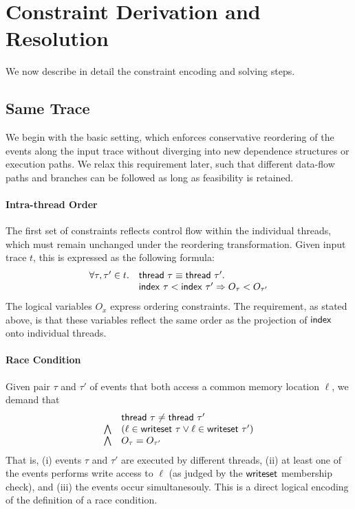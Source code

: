 \section{Constraint Derivation and Resolution}

We now describe in detail the constraint encoding and solving steps.

\subsection{Same Trace}

We begin with the basic setting, which enforces conservative reordering of the events along the input trace without diverging into new dependence structures or execution paths. We relax this requirement later, such that different data-flow paths and branches can be followed as long as feasibility is retained.

\paragraph{Intra-thread Order}

The first set of constraints reflects control flow within the individual threads, which must remain unchanged under the reordering transformation. Given input trace $t$, this is expressed as the following formula:
$$
\begin{array}{rl}
	\forall \tau,\tau' \in t. & {\sf thread}\ \tau \equiv {\sf thread}\ \tau'. \\
										& {\sf index}\ \tau < {\sf index}\ \tau' \Rightarrow O_{\tau} < O_{\tau'}
\end{array}
$$ 
The logical variables $O_x$ express ordering constraints. The requirement, as stated above, is that these variables
reflect the same order as the projection of ${\sf index}$ onto individual threads.

\paragraph{Race Condition}

Given pair $\tau$ and $\tau'$ of events that both access a common memory location $\ell$, we demand that
$$
\begin{array}{rl}
					& {\sf thread}\ \tau \neq {\sf thread}\ \tau' \\
\bigwedge 	& (\ell \in {\sf writeset}\ \tau \vee \ell \in {\sf writeset}\ \tau') \\
\bigwedge   & O_{\tau} = O_{\tau'}
\end{array}
$$
That is, (i) events $\tau$ and $\tau'$ are executed by different threads, (ii) at least one of the events performs write access to $\ell$ (as judged by the ${\sf writeset}$ membership check), and (iii) the events occur simultanesouly. This is a direct logical encoding of the definition of a race condition.

